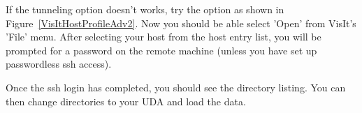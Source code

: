 \documentclass[12pt]{article}
\begin{document}


\begin{figure}[h]
  \centering
  \vspace{5pt}
  \hspace{20pt}
  \qquad
  \caption{}
  \vspace{-10pt}
  \label{}
\end{figure}

If the tunneling option doesn't works, try the option as shown in
Figure~\ref{VisItHostProfileAdv2}. Now you should be able select
'Open' from VisIt's 'File' menu. After selecting your host from the
host entry list, you will be prompted for a password on the remote
machine (unless you have set up passwordless ssh access).

Once the ssh login has completed, you should see the directory
listing. You can then change directories to your UDA and load the
data.





\end{document}
